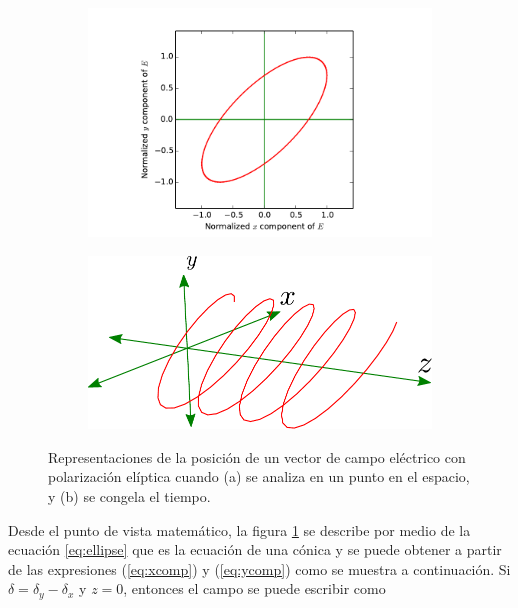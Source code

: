 \begin{figure}[h!]
\centering
\begin{subfigure}{.45\textwidth}
  \centering
  \includegraphics[width=1\linewidth]{ellipse_clean}
  \caption{}
\label{fig:ellipse_clean}
\end{subfigure}\qquad
\begin{subfigure}{.45\textwidth}
  \centering
  \includegraphics[width=.8\linewidth]{trayectory_clean}
  \caption{}
  \label{fig:trayectory_clean}
\end{subfigure}
\caption[Distintas representaciones del campo eléctrico para ilustrar
la polarización]{Representaciones de la posición de un vector de campo
  eléctrico con polarización elíptica cuando (a) se analiza en un
  punto en el espacio, y (b) se  congela el tiempo.} 
\label{fig:general_field}
\end{figure} 

Desde el punto de vista matemático, la figura
\ref{fig:ellipse_clean} se describe por medio de la ecuación
\ref{eq:ellipse} que es la ecuación de una cónica y se puede obtener
a partir de las expresiones (\ref{eq:xcomp}) y (\ref{eq:ycomp}) como se
muestra a continuación. Si $\delta = \delta_y-\delta_x$ y $z=0$,
entonces el campo se puede escribir como

